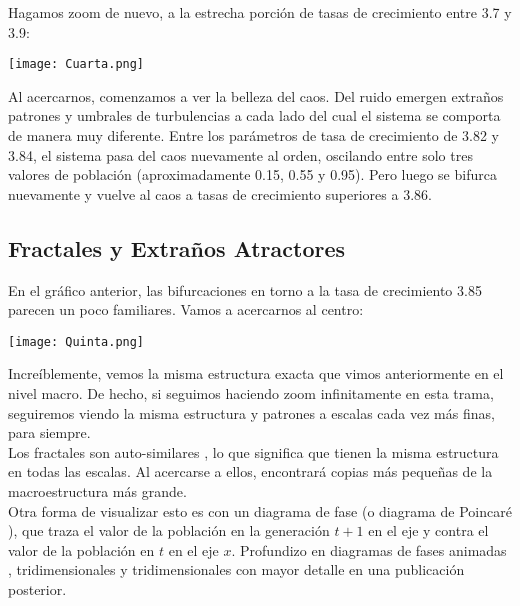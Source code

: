 \documentclass[12pt]{article}
\begin{document}
Hagamos zoom de nuevo, a la estrecha porción de tasas de crecimiento entre 3.7 y 3.9:
\begin{center}
    \texttt{[image: Cuarta.png]}
\end{center}
Al acercarnos, comenzamos a ver la belleza del caos. Del ruido emergen extraños patrones y umbrales de turbulencias a cada lado del cual el sistema se comporta de manera muy diferente. Entre los parámetros de tasa de crecimiento de 3.82 y 3.84, el sistema pasa del caos nuevamente al orden, oscilando entre solo tres valores de población (aproximadamente 0.15, 0.55 y 0.95). Pero luego se bifurca nuevamente y vuelve al caos a tasas de crecimiento superiores a 3.86.

\subsection*{Fractales y Extraños Atractores}
En el gráfico anterior, las bifurcaciones en torno a la tasa de crecimiento 3.85 parecen un poco familiares. Vamos a acercarnos al centro:

\begin{center}
    \texttt{[image: Quinta.png]}
\end{center}
Increíblemente, vemos la misma estructura exacta que vimos anteriormente en el nivel macro. De hecho, si seguimos haciendo zoom infinitamente en esta trama, seguiremos viendo la misma estructura y patrones a escalas cada vez más finas, para siempre. \\

 Los fractales son auto-similares , lo que significa que tienen la misma estructura en todas las escalas. Al acercarse a ellos, encontrará copias más pequeñas de la macroestructura más grande. \\
 
 Otra forma de visualizar esto es con un diagrama de fase  (o  diagrama de Poincaré ), que traza el valor de la población en la generación  $t + 1$ en el eje y contra el valor de la población en $t$ en el eje $x$. Profundizo en diagramas de fases animadas , tridimensionales y tridimensionales con mayor detalle en una publicación posterior.\\
 
\end{document}
